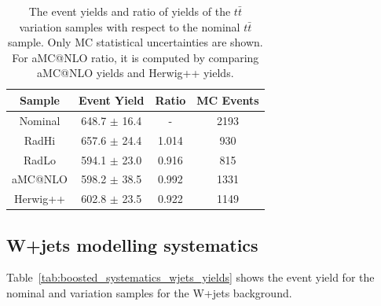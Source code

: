 \begin{table}[htbp!]
\begin{center}
\begin{tabular}{c|c|c||c}
Sample     & Event Yield & Ratio & MC Events \\ 
\hline
Nominal    & 648.7  $\pm$ 16.4  & -     & 2193  \\
RadHi      & 657.6  $\pm$ 24.4  & 1.014 & 930   \\
RadLo      & 594.1  $\pm$ 23.0  & 0.916 & 815   \\
aMC@NLO    & 598.2  $\pm$ 38.5  & 0.992 & 1331  \\
Herwig++   & 602.8  $\pm$ 23.5  & 0.922 & 1149  \\
\end{tabular}
\end{center}
\caption{The event yields and ratio of yields of the $t\bar{t}$ variation samples
with respect to the nominal $t\bar{t}$ sample. Only MC statistical uncertainties are shown.
For aMC@NLO ratio, it is computed by comparing aMC@NLO yields and Herwig++ yields.} 
\label{tab:boosted_systematics_ttbar_yields}
\end{table}



\FloatBarrier

%
%
\subsection{W+jets modelling systematics}
\label{app:boosted_syst_wjets}
Table~\ref{tab:boosted_systematics_wjets_yields} shows the event yield for the nominal 
and variation samples for the W+jets background.


